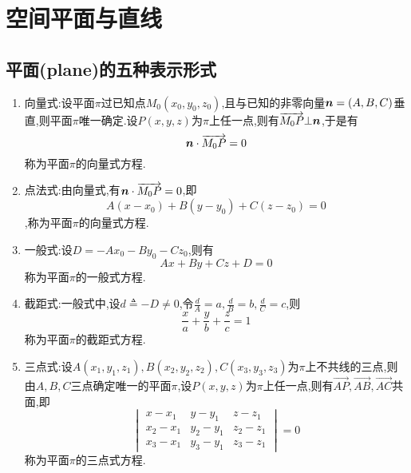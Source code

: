 \setcounter{chapter}{1}
\chapter{空间平面与直线}

\section{平面(plane)的五种表示形式}

\begin{definition}[平面的五种表示形式]
    \begin{enumerate}
        \item 向量式:设平面$\pi$过已知点$M_0(x_0,y_0,z_0)$,且与已知的非零向量$\bm{n}=(A,B,C)$垂直,则平面$\pi$唯一确定.设$P(x,y,z)$为$\pi$上任一点,则有$\overrightarrow{M_0P}\bot\bm{n}$,于是有$$\bm{n}\cdot \overrightarrow{M_0P}=0$$称为平面$\pi$的向量式方程.
        \item 点法式:由向量式,有$\bm{n}\cdot \overrightarrow{M_0P}=0$,即$$A(x-x_0)+B(y-y_0)+C(z-z_0)=0$$,称为平面$\pi$的向量式方程.
        \item 一般式:设$D=-Ax_0-By_0-Cz_0$,则有$$Ax+By+Cz+D=0$$称为平面$\pi$的一般式方程.
        \item 截距式:一般式中,设$d\triangleq-D\neq 0$,令$\frac{d}{A}=a,\frac{d}{B}=b,\frac{d}{C}=c$,则$$\frac{x}{a}+\frac{y}{b}+\frac{z}{c}=1$$称为平面$\pi$的截距式方程.
        \item 三点式:设$A(x_1,y_1,z_1),B(x_2,y_2,z_2),C(x_3,y_3,z_3)$为$\pi$上不共线的三点,则由$A,B,C$三点确定唯一的平面$\pi$,设$P(x,y,z)$为$\pi$上任一点,则有$\overrightarrow{AP},\overrightarrow{AB},\overrightarrow{AC}$共面,即$$\begin{vmatrix}x-x_1&y-y_1&z-z_1\\x_2-x_1&y_2-y_1&z_2-z_1\\x_3-x_1&y_3-y_1&z_3-z_1\end{vmatrix}=0$$称为平面$\pi$的三点式方程.
    \end{enumerate}
\end{definition}

